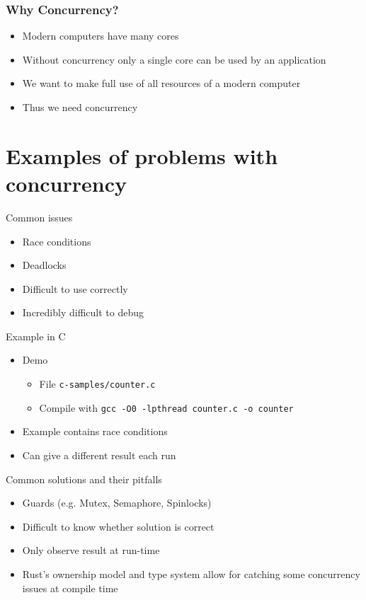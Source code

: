 \documentclass{beamer}
\begin{document}
\begin{frame}
    \frametitle{Why Concurrency?}
    \begin{itemize}
        \item Modern computers have many cores
        \item Without concurrency only a single core can be used by an application
        \item We want to make full use of all resources of a modern computer
        \item Thus we need concurrency
    \end{itemize}
\end{frame}

\section{Examples of problems with concurrency}

\begin{frame}{Common issues}
    \begin{itemize}
        \item Race conditions
        \item Deadlocks
        \item Difficult to use correctly
        \item Incredibly difficult to debug
    \end{itemize}
\end{frame}

\begin{frame}{Example in C}
    \begin{itemize}
        \item Demo
            \begin{itemize}
                \item File \texttt{c-samples/counter.c}
                \item Compile with \texttt{gcc -O0 -lpthread counter.c -o counter}
            \end{itemize}
        \item Example contains race conditions
        \item Can give a different result each run
    \end{itemize}
\end{frame}

\begin{frame}{Common solutions and their pitfalls}
    \begin{itemize}
        \item Guards (e.g. Mutex, Semaphore, Spinlocks)
        \item Difficult to know whether solution is correct
        \item Only observe result at run-time
        \item Rust's ownership model and type system allow for catching some concurrency issues at compile time
    \end{itemize}
\end{frame}
\end{document}
